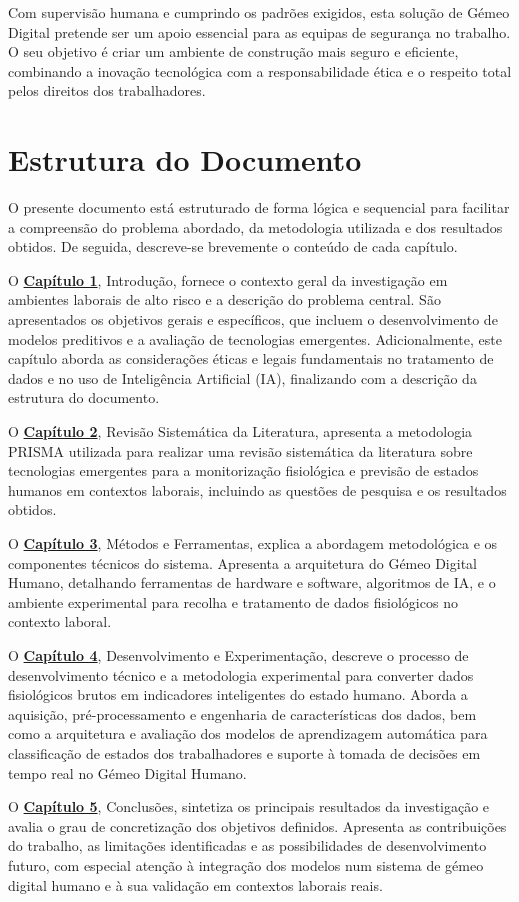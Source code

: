 Com supervisão humana e cumprindo os padrões exigidos, esta solução de Gémeo Digital pretende ser um apoio essencial para as equipas de segurança no trabalho. O seu objetivo é criar um ambiente de construção mais seguro e eficiente, combinando a inovação tecnológica com a responsabilidade ética e o respeito total pelos direitos dos trabalhadores.

\section{Estrutura do Documento}
\label{sec:estrutura}

O presente documento está estruturado de forma lógica e sequencial para facilitar a compreensão do problema abordado, da metodologia utilizada e dos resultados obtidos. De seguida, descreve-se brevemente o conteúdo de cada capítulo.

O \hyperref[chap:Introducao]{\textbf{Capítulo 1}}, Introdução, fornece o contexto geral da investigação em ambientes laborais de alto risco e a descrição do problema central. São apresentados os objetivos gerais e específicos, que incluem o desenvolvimento de modelos preditivos e a avaliação de tecnologias emergentes. Adicionalmente, este capítulo aborda as considerações éticas e legais fundamentais no tratamento de dados e no uso de Inteligência Artificial (IA), finalizando com a descrição da estrutura do documento.

O \hyperref[chap:TecnologiasEmergentes]{\textbf{Capítulo 2}}, Revisão Sistemática da Literatura, apresenta a metodologia PRISMA utilizada para realizar uma revisão sistemática da literatura sobre tecnologias emergentes para a monitorização fisiológica e previsão de estados humanos em contextos laborais, incluindo as questões de pesquisa e os resultados obtidos.

O \hyperref[chap:MetodosFerramentas]{\textbf{Capítulo 3}}, Métodos e Ferramentas, explica a abordagem metodológica e os componentes técnicos do sistema. Apresenta a arquitetura do Gémeo Digital Humano, detalhando ferramentas de hardware e software, algoritmos de IA, e o ambiente experimental para recolha e tratamento de dados fisiológicos no contexto laboral.

O \hyperref[chap:Chapter4]{\textbf{Capítulo 4}}, Desenvolvimento e Experimentação, descreve o processo de desenvolvimento técnico e a metodologia experimental para converter dados fisiológicos brutos em indicadores inteligentes do estado humano. Aborda a aquisição, pré-processamento e engenharia de características dos dados, bem como a arquitetura e avaliação dos modelos de aprendizagem automática para classificação de estados dos trabalhadores e suporte à tomada de decisões em tempo real no Gémeo Digital Humano.

O \hyperref[chap:Conclusoes]{\textbf{Capítulo 5}}, Conclusões, sintetiza os principais resultados da investigação e avalia o grau de concretização dos objetivos definidos. Apresenta as contribuições do trabalho, as limitações identificadas e as possibilidades de desenvolvimento futuro, com especial atenção à integração dos modelos num sistema de gémeo digital humano e à sua validação em contextos laborais reais.